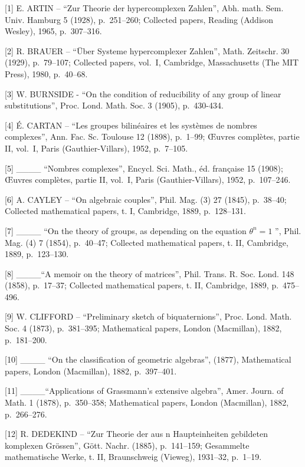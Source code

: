 
{[}1{]} E. ARTIN -- ``Zur Theorie der hypercomplexen Zahlen'', Abh. math. Sem. Univ. Hamburg 5 (1928), p.~251--260; Collected papers, Reading (Addison Wesley), 1965, p.~307--316.

{[}2{]} R. BRAUER -- ``Über Systeme hypercomplexer Zahlen'', Math. Zeitschr. 30 (1929), p.~79--107; Collected papers, vol.~I, Cambridge, Massachusetts (The MIT Press), 1980, p.~40--68.

{[}3{]} W. BURNSIDE - ``On the condition of reducibility of any group of linear substitutions'', Proc. Lond. Math. Soc. 3 (1905), p.~430-434.

{[}4{]} É. CARTAN -- ``Les groupes bilinéaires et les systèmes de nombres complexes'', Ann. Fac. Sc. Toulouse 12 (1898), p.~1--99; Œuvres complètes, partie II, vol.~I, Paris (Gauthier-Villars), 1952, p.~7--105.

{[}5{]} \_\_\_\_ ``Nombres complexes'', Encycl. Sci. Math., éd. française 15 (1908); Œuvres complètes, partie II, vol.~I, Paris (Gauthier-Villars), 1952, p.~107--246.

{[}6{]} A. CAYLEY -- ``On algebraic couples'', Phil. Mag. (3) 27 (1845), p.~38--40; Collected mathematical papers, t. I, Cambridge, 1889, p.~128--131.

{[}7{]} \_\_\_\_ ``On the theory of groups, as depending on the equation \(\theta^{n}=1\) '', Phil. Mag. (4) 7 (1854), p.~40--47; Collected mathematical papers, t. II, Cambridge, 1889, p.~123--130.

{[}8{]} \_\_\_\_``A memoir on the theory of matrices'', Phil. Trans. R. Soc. Lond. 148 (1858), p.~17--37; Collected mathematical papers, t. II, Cambridge, 1889, p.~475--496.

{[}9{]} W. CLIFFORD -- ``Preliminary sketch of biquaternions'', Proc. Lond. Math. Soc. 4 (1873), p.~381--395; Mathematical papers, London (Macmillan), 1882, p.~181--200.

{[}10{]} \_\_\_\_ ``On the classification of geometric algebras'', (1877), Mathematical papers, London (Macmillan), 1882, p.~397--401.

{[}11{]} \_\_\_\_``Applications of Grassmann's extensive algebra'', Amer. Journ. of Math. 1 (1878), p.~350--358; Mathematical papers, London (Macmillan), 1882, p.~266--276.

{[}12{]} R. DEDEKIND -- ``Zur Theorie der aus n Haupteinheiten gebildeten komplexen Grössen'', Gött. Nachr. (1885), p.~141--159; Gesammelte mathematische Werke, t. II, Braunschweig (Vieweg), 1931--32, p.~1--19.


